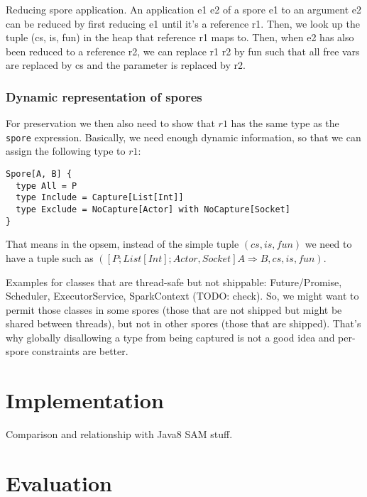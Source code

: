 \documentclass{llncs}
\begin{document}
Reducing spore application. An application e1 e2 of a spore e1 to an argument
e2 can be reduced by first reducing e1 until it's a reference r1. Then, we
look up the tuple (cs, is, fun) in the heap that reference r1 maps to. Then,
when e2 has also been reduced to a reference r2, we can replace r1 r2 by fun
such that all free vars are replaced by cs and the parameter is replaced by
r2.

\subsubsection{Dynamic representation of spores}

For preservation we then also need to show that $r1$ has the same type as the
\verb|spore| expression. Basically, we need enough dynamic information, so
that we can assign the following type to $r1$:

\begin{lstlisting}
Spore[A, B] {
  type All = P
  type Include = Capture[List[Int]]
  type Exclude = NoCapture[Actor] with NoCapture[Socket]
}
\end{lstlisting}

That means in the opsem, instead of the simple tuple $(cs, is, fun)$ we need to
have a tuple such as
$([{P} ; {List[Int]} ; {Actor, Socket}] A \Rightarrow B, cs, is, fun)$.

Examples for classes that are thread-safe but not shippable: Future/Promise,
Scheduler, ExecutorService, SparkContext (TODO: check). So, we might want to
permit those classes in some spores (those that are not shipped but might be
shared between threads), but not in other spores (those that are shipped).
That's why globally disallowing a type from being captured is not a good idea
and per-spore constraints are better.


\section{Implementation}

Comparison and relationship with Java8 SAM stuff.

\section{Evaluation}

%
\end{document}
